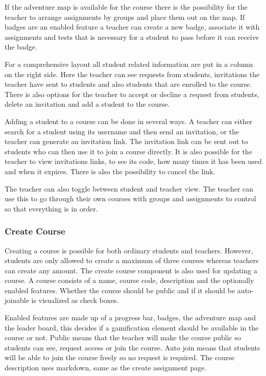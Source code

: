 If the adventure map is available for the course there is the possibility for the teacher to arrange assignments by groups and place them out on the map. If badges are an enabled feature a teacher can create a new badge, associate it with assignments and tests that is necessary for a student to pass before it can receive the badge.

For a comprehensive layout all student related information are put in a column on the right side. Here the teacher can see requests from students, invitations the teacher have sent to students and also students that are enrolled to the course. There is also options for the teacher to accept or decline a request from students, delete an invitation and add a student to the course. 

Adding a student to a course can be done in several ways. A teacher can either search for a student using its username and then send an invitation, or the teacher can generate an invitation link. The invitation link can be sent out to students who can then use it to join a course directly. It is also possible for the teacher to view invitations links, to see its code, how many times it has been used and when it expires. There is also the possibility to cancel the link.

The teacher can also toggle between student and teacher view. The teacher can use this to go through their own courses with groups and assignments to control so that everything is in order. 

\subsubsection{Create Course}
Creating a course is possible for both ordinary students and teachers. However, students are only allowed to create a maximum of three courses whereas teachers can create any amount. The create course component is also used for updating a course. A course consists of a name, course code, description and the optionally enabled features. Whether the course should be public and if it should be auto-joinable is visualized as check boxes.

Enabled features are made up of a progress bar, badges, the adventure map and the leader board, this decides if a gamification element should be available in the course or not. Public means that the teacher will make the course public so students can see, request access or join the course. Auto join means that students will be able to join the course freely so no request is required. The course description uses markdown, same as the create assignment page. 

